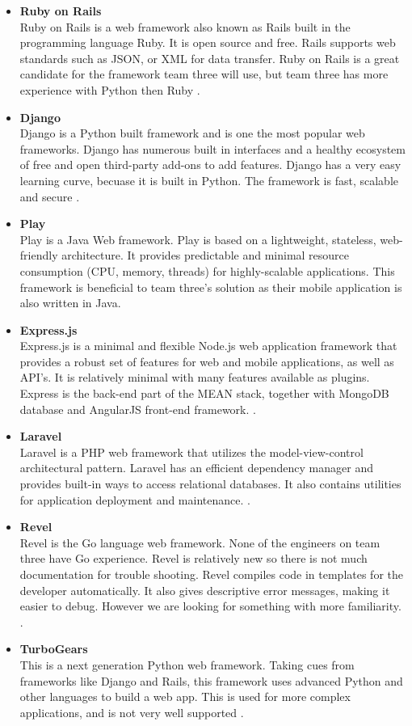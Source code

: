 \documentclass[Letter,11pt]{article}
\begin{document}
		\begin{itemize}
			\item \textbf{Ruby on Rails} \\
			Ruby on Rails is a web framework also known as Rails built in the programming language Ruby. It is open source and free. Rails supports web standards such as JSON, or XML for data transfer. Ruby on Rails is a great candidate for the framework team three will use, but team three has more experience with Python then Ruby \cite{rubyonrails}.  
			\item \textbf{Django} \\
			Django is a Python built framework and is one the most popular web frameworks. Django has numerous built in interfaces and a healthy ecosystem of free and open third-party add-ons to add features. Django has a very easy learning curve, becuase it is built in Python. The framework is fast, scalable and secure \cite{django}.
			\item \textbf{Play} \\

			Play is a Java Web framework. Play is based on a lightweight, stateless, web-friendly architecture. It provides predictable and minimal resource consumption (CPU, memory, threads) for highly-scalable applications. This framework is beneficial to team three's solution as their mobile application is also written in Java\cite{play}.
			\item  \textbf{Express.js}\\
			Express.js is a minimal and flexible Node.js web application framework that provides a robust set of features for web and mobile applications, as well as API's. It is relatively minimal with many features available as plugins. Express is the back-end part of the MEAN stack, together with MongoDB database and AngularJS front-end framework. \cite{express}.
			\item \textbf{Laravel} \\
			Laravel is a PHP web framework that utilizes the model-view-control architectural pattern.  Laravel has an efficient dependency manager and provides built-in ways to access relational databases.  It also contains utilities for application deployment and maintenance. \cite{laravel}. 
			\item \textbf{Revel} \\
			Revel is the Go language web framework. None of the engineers on team three have Go experience. Revel is relatively new so there is not much documentation for trouble shooting. Revel compiles code in templates for the developer automatically. It also gives descriptive error messages, making it easier to debug. However we are looking for something with more familiarity. \cite{revel}.
			\item \textbf{TurboGears}\\
			This is a next generation Python web framework. Taking cues from frameworks like Django and Rails, this framework uses advanced Python and other languages to build a web app. This is used for more complex applications, and is not very well supported \cite{turbogears}.
		\end{itemize}
		
\end{document}
